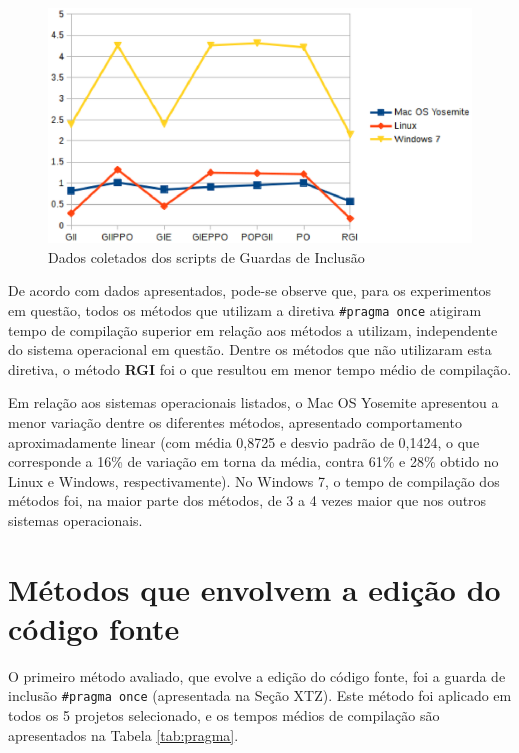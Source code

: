\begin{figure}[!h]
    \centering
        \includegraphics{figuras/graficos/benchmark.eps}
    \caption{Dados coletados dos scripts de Guardas de Inclusão}
    \label{benchmark_guardas_de_inclusao}
\end{figure}

De acordo com dados apresentados, pode-se observe que, para os experimentos em questão, todos os métodos que utilizam a diretiva 
\texttt{\#pragma once} atigiram tempo de compilação superior em relação aos métodos a utilizam, independente do sistema operacional em questão.
Dentre os métodos que não utilizaram esta diretiva, o método \textbf{RGI} foi o que resultou em menor tempo médio de compilação.

Em relação aos sistemas operacionais listados, o Mac OS Yosemite apresentou a menor variação dentre os diferentes métodos, apresentado comportamento 
aproximadamente linear (com média 0,8725 e desvio padrão de 0,1424, o que corresponde a 16\% de variação em torna da média, contra 61\% e 28\% obtido
no Linux e Windows, respectivamente).  No Windows 7, o tempo de compilação dos métodos foi, na maior parte dos métodos, de 3 a 4 vezes maior que nos outros sistemas operacionais. 

\section{Métodos que envolvem a edição do código fonte}

O primeiro método avaliado, que evolve a edição do código fonte, foi a guarda de inclusão \texttt{\#pragma once} (apresentada na Seção XTZ). Este método foi aplicado em todos os 5 projetos selecionado, e os tempos médios de compilação são apresentados na Tabela \ref{tab:pragma}.

